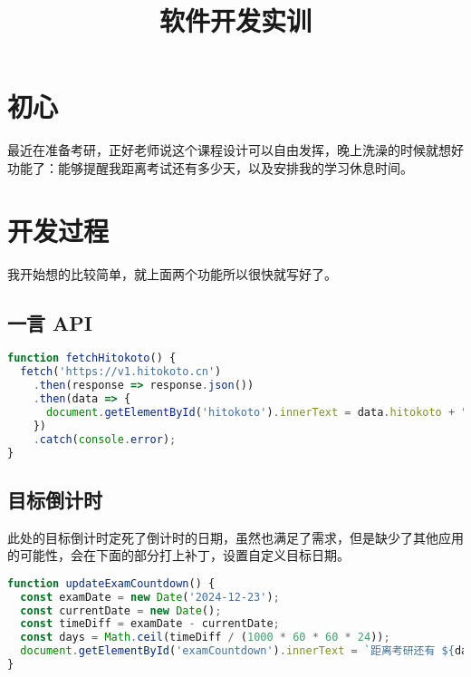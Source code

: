 \documentclass{hfutreport}
\title{软件开发实训}
\begin{document}
 \maketitle


\setmainfont{MesloLGS NF Regular}

\pagestyle{plain}
\tableofcontents
\newpage
\pagestyle{plain}

\setcounter{page}{1}

\section{初心}
最近在准备考研，正好老师说这个课程设计可以自由发挥，晚上洗澡的时候就想好功能了：能够提醒我距离考试还有多少天，以及安排我的学习休息时间。

\section{开发过程}

我开始想的比较简单，就上面两个功能所以很快就写好了。

\subsection{ 一言 API}

\begin{lstlisting}[language=javascript]
function fetchHitokoto() {
  fetch('https://v1.hitokoto.cn')
    .then(response => response.json())
    .then(data => {
      document.getElementById('hitokoto').innerText = data.hitokoto + " —— " + data.from;
    })
    .catch(console.error);
}
\end{lstlisting}

\subsection{目标倒计时}

此处的目标倒计时定死了倒计时的日期，虽然也满足了需求，但是缺少了其他应用的可能性，会在下面的部分打上补丁，设置自定义目标日期。

\begin{lstlisting}[language=javascript]
function updateExamCountdown() {
  const examDate = new Date('2024-12-23');
  const currentDate = new Date();
  const timeDiff = examDate - currentDate;
  const days = Math.ceil(timeDiff / (1000 * 60 * 60 * 24));
  document.getElementById('examCountdown').innerText = `距离考研还有 ${days} 天`;
}
\end{lstlisting}
\end{document}

